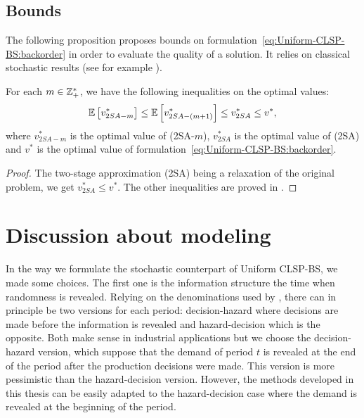 



\subsection{Bounds}




The following proposition proposes bounds on formulation~\cref{eq:Uniform-CLSP-BS:backorder} in order to evaluate the quality of a solution.
It relies on classical stochastic results (see for example \citet{Shapiro2009}).


\begin{prop}\label{prop:CLSP-BS:stochastic:bounds}
For each $m\in\mathbb{Z}_+^*$, we have the following inequalities on the optimal values:
\begin{equation}
  \espe\sqbracket{v^*_{2SA-m}}
  \le\espe\sqbracket{v^*_{2SA-(m+1)}}
  \le v^*_{2SA}
  \le v^*,
\end{equation}
where $v^*_{2SA-m}$ is the optimal value of (2SA-$m$), $v^*_{2SA}$ is the optimal value of (2SA) and $v^*$ is the optimal value of formulation~\cref{eq:Uniform-CLSP-BS:backorder}.
\end{prop}


\begin{proof}
The two-stage approximation (2SA) being a relaxation of the original problem, we get $v^*_{2SA} \le v^*$. The other inequalities are proved in \citet[Proposition 5.6]{Shapiro2009}.
\end{proof}




\section{Discussion about modeling}
\label{sec:stoch-CLSP-BS-discussion}


In the way we formulate the stochastic counterpart of Uniform CLSP-BS, we made some choices.
The first one is the information structure \ie the time when randomness is revealed.
Relying on the denominations used by \citet{Carpentier2015}, there can in principle be two versions for each period: decision-hazard where decisions are made before the information is revealed and hazard-decision which is the opposite.
Both make sense in industrial applications but we choose the decision-hazard version, which suppose that the demand of period $t$ is revealed at the end of the period after the production decisions were made.
This version is more pessimistic than the hazard-decision version.
However, the methods developed in this thesis can be easily adapted to the hazard-decision case where the demand is revealed at the beginning of the period.


